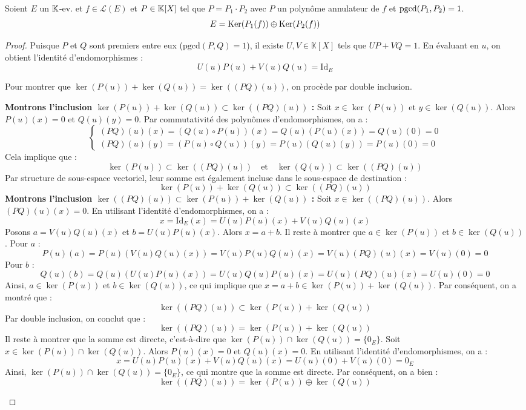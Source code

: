\documentclass[12pt, a4paper]{report}
\begin{document}
\begin{theorem}
    Soient $E$ un $\mathbb{K}$-ev. et $f \in \mathcal L(E)$ et $P \in \mathbb{K}[X]$ tel que $P = P_1\cdot P_2$ avec $P$ un polynôme annulateur de $f$ et $\mathrm{pgcd}(P_1,P_2) = 1$.
    $$E = \mathrm{Ker}(P_1(f)) \oplus \mathrm{Ker}(P_2(f))$$
\end{theorem}

\begin{proof}
    Puisque $P$ et $Q$ sont premiers entre eux ($\mathrm{pgcd}(P,Q) = 1$), il existe $U,V \in \mathbb K[X]$ tels que $UP + VQ = 1$. En évaluant en $u$, on obtient l'identité d'endomorphismes :
$$U(u)P(u) + V(u)Q(u) = \mathrm{Id}_E$$

Pour montrer que $\ker(P(u)) + \ker(Q(u)) = \ker((PQ)(u))$, on procède par double inclusion.
\begin{outline}
	\1 \textbf{Montrons l'inclusion $\ker(P(u)) + \ker(Q(u)) \subset \ker((PQ)(u))$ :}
	\2 Soit $x \in \ker(P(u))$ et $y \in \ker(Q(u))$. Alors $P(u)(x) = 0$ et $Q(u)(y) = 0$.
	\2 Par commutativité des polynômes d'endomorphismes, on a :
	$$\begin{cases}
	(PQ)(u)(x) = (Q(u)\circ P(u))(x) = Q(u)(P(u)(x)) = Q(u)(0) = 0 \\
	(PQ)(u)(y) = (P(u)\circ Q(u))(y) = P(u)(Q(u)(y)) = P(u)(0) = 0
	\end{cases}$$
	\2 Cela implique que :
	$$\ker(P(u)) \subset \ker((PQ)(u)) \quad \text{et} \quad \ker(Q(u)) \subset \ker((PQ)(u))$$
	\2 Par structure de sous-espace vectoriel, leur somme est également incluse dans le sous-espace de destination :
	$$\ker(P(u)) + \ker(Q(u)) \subset \ker((PQ)(u))$$
	\1 \textbf{Montrons l'inclusion $\ker((PQ)(u)) \subset \ker(P(u)) + \ker(Q(u))$ :}
	\2 Soit $x \in \ker((PQ)(u))$. Alors $(PQ)(u)(x) = 0$.
	\2 En utilisant l'identité d'endomorphismes, on a :
	$$x = \mathrm{Id}_E(x) = U(u)P(u)(x) + V(u)Q(u)(x)$$
	\2 Posons $a = V(u)Q(u)(x)$ et $b = U(u)P(u)(x)$. Alors $x = a + b$.
	\2 Il reste à montrer que $a \in \ker(P(u))$ et $b \in \ker(Q(u))$.
	\3 Pour $a$ :
	$$P(u)(a) = P(u)(V(u)Q(u)(x)) = V(u)P(u)Q(u)(x) = V(u)(PQ)(u)(x) = V(u)(0) = 0$$
	\3 Pour $b$ :
	$$Q(u)(b) = Q(u)(U(u)P(u)(x)) = U(u)Q(u)P(u)(x) = U(u)(PQ)(u)(x) = U(u)(0) = 0$$
	\2 Ainsi, $a \in \ker(P(u))$ et $b \in \ker(Q(u))$, ce qui implique que $x = a + b \in \ker(P(u)) + \ker(Q(u))$.
	\2 Par conséquent, on a montré que :
	$$\ker((PQ)(u)) \subset \ker(P(u)) + \ker(Q(u))$$
	\2 Par double inclusion, on conclut que :
	$$\ker((PQ)(u)) = \ker(P(u)) + \ker(Q(u))$$
	\1 Il reste à montrer que la somme est directe, c'est-à-dire que $\ker(P(u)) \cap \ker(Q(u)) = \{0_E\}$.
	\2 Soit $x \in \ker(P(u)) \cap \ker(Q(u))$. Alors $P(u)(x) = 0$ et $Q(u)(x) = 0$.
	\2 En utilisant l'identité d'endomorphismes, on a :
	$$x = U(u)P(u)(x) + V(u)Q(u)(x) = U(u)(0) + V(u)(0) = 0_E$$
	\2 Ainsi, $\ker(P(u)) \cap \ker(Q(u)) = \{0_E\}$, ce qui montre que la somme est directe.
	\1 Par conséquent, on a bien :
	$$\ker((PQ)(u)) = \ker(P(u)) \oplus \ker(Q(u))$$
\end{outline}
\end{proof}
\end{document}
